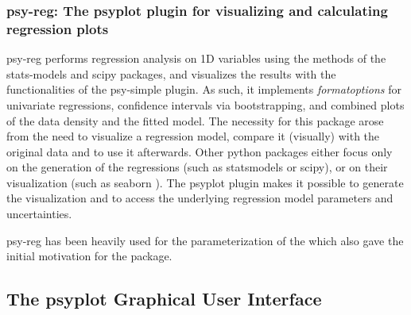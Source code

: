 \documentclass[
11pt, %
english, %
singlespacing, %
headsepline, %
]{article} %
\begin{document}
\begin{refsection}
\subsubsection{psy-reg: The psyplot plugin for visualizing and calculating regression plots}

psy-reg \citep{Sommer2017d} performs regression analysis on 1D variables using the methods of the stats-models \citep{SeaboldPerktold2010} and scipy \citep{JonesOliphantPetersonEtAl2001, Oliphant2007} packages, and visualizes the results with the functionalities of the psy-simple plugin. As such, it implements \textit{formatoptions} for univariate regressions, confidence intervals via bootstrapping, and combined plots of the data density and the fitted model. The necessity for this package arose from the need to visualize a regression model, compare it (visually) with the original data and to use it afterwards. Other python packages either focus only on the generation of the regressions (such as statsmodels or scipy), or on their visualization (such as seaborn \citep{WaskomBotvinnikOKaneEtAl2018}). The psyplot plugin makes it possible to generate the visualization and to access the underlying regression model parameters and uncertainties.

psy-reg has been heavily used for the parameterization of the which also gave the initial motivation for the package. 


\subsection{The psyplot Graphical User Interface}  \label{sec:psyplot-gui}


\end{refsection}
\end{document}
